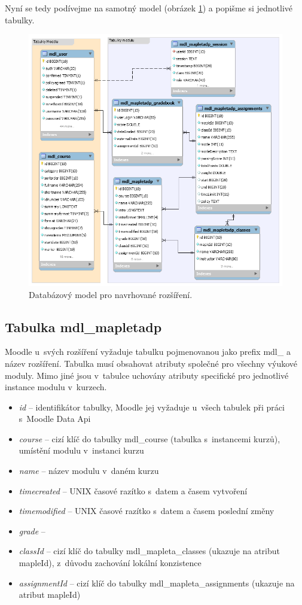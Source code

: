 \documentclass[
print,
  11pt,
  table,   
  nolof,    
  nolot,
  oneside,final
]{fithesis3}
\begin{document}
Nyní se tedy podívejme na samotný model (obrázek \ref{fig:datamodel}) a popišme si jednotlivé tabulky.
\begin{figure}[htb]
		  \begin{center}
		    \includegraphics[width=120mm]{images/datamodel.png}
		   \end{center}
		  \caption{Databázový model pro navrhované rozšíření.}
		  \label{fig:datamodel}
		\end{figure}
\subsection*{Tabulka mdl\_mapletadp}
Moodle u~svých rozšíření vyžaduje tabulku pojmenovanou jako prefix mdl\_ a název rozšíření. Tabulka musí obsahovat atributy společné pro všechny výukové moduly. Mimo jiné jsou v~tabulce uchovány atributy specifické pro jednotlivé instance modulu v~kurzech.
\begin{itemize}
	\item \textit{id} -- identifikátor tabulky, Moodle jej vyžaduje u~všech tabulek při práci s~Moodle Data Api 
	\item \textit{course} -- cizí klíč do tabulky mdl\_course (tabulka s~instancemi kurzů), umístění modulu v~instanci kurzu 
	\item \textit{name} -- název modulu v~daném kurzu
	\item \textit{timecreated} -- UNIX časové razítko s~datem a časem vytvoření
	\item \textit{timemodified} -- UNIX časové razítko s~datem a časem poslední změny
	\item \textit{grade} -- 
	\item \textit{classId} -- cizí klíč do tabulky mdl\_mapleta\_classes (ukazuje na atribut mapleId), z~důvodu zachování lokální konzistence
	\item \textit{assignmentId} -- cizí klíč do tabulky mdl\_mapleta\_assignments (ukazuje na atribut mapleId)
\end{itemize}
\end{document}
